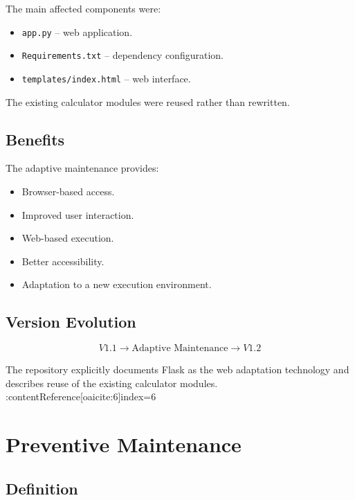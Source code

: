 \documentclass[12pt,a4paper]{report}
\begin{document}
The main affected components were:

\begin{itemize}
    \item \texttt{app.py} -- web application.
    \item \texttt{Requirements.txt} -- dependency configuration.
    \item \texttt{templates/index.html} -- web interface.
\end{itemize}

The existing calculator modules were reused rather than rewritten.

\section{Benefits}

The adaptive maintenance provides:

\begin{itemize}
    \item Browser-based access.
    \item Improved user interaction.
    \item Web-based execution.
    \item Better accessibility.
    \item Adaptation to a new execution environment.
\end{itemize}

\section{Version Evolution}

\[
V1.1
\rightarrow
\text{Adaptive Maintenance}
\rightarrow
V1.2
\]

The repository explicitly documents Flask as the web adaptation
technology and describes reuse of the existing calculator modules. :contentReference[oaicite:6]{index=6}


\chapter{Preventive Maintenance}

\section{Definition}
\end{document}
